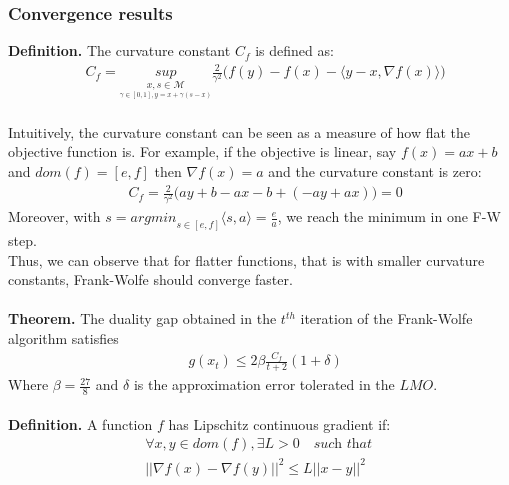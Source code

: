 \documentclass{article}
\begin{document}
\subsubsection{Convergence results}
\textbf{Definition.} The curvature constant $C_{f}$ is defined as:
\begin{equation*}
\begin{aligned}
    &C_{f}= \underset{\underset{ \gamma\in[0,1], y=x+\gamma(s-x)}{x,s\in\mathcal{M}}}{sup}\frac{2}{\gamma^{2}}\Big(f(y)- f(x)- \langle y-x, \nabla f(x)\rangle\Big)
\end{aligned}
\end{equation*}
\\
Intuitively, the curvature constant can be seen as a measure of how flat the objective function is. For example, if the objective is linear, say $f(x)= ax+ b$ and $dom(f)=[e,f]$ then $\nabla f(x)= a$ and the curvature constant is zero:
\begin{equation*}
\begin{aligned}
    &C_{f}= \frac{2}{\gamma^{2}}\Big(ay+ b- ax- b +(-ay +ax)\Big)= 0
\end{aligned}
\end{equation*}
Moreover, with $s=\textit{argmin}_{s\in[e,f]}\langle s, a\rangle= \frac{e}{a}$, we reach the minimum in one F-W step.\\
Thus, we can observe that for flatter functions, that is with smaller curvature constants, Frank-Wolfe should converge faster.
\\
\\
\textbf{Theorem.} The duality gap obtained in the $t^{th}$ iteration of the Frank-Wolfe algorithm satisfies
\begin{equation*}
\begin{aligned}
    &g(x_{t})\leq 2\beta\frac{C_{f}}{t+2}(1+\delta)
\end{aligned}
\end{equation*}
Where $\beta= \frac{27}{8}$ and $\delta$ is the approximation error tolerated in the $LMO$.
\\
\\
\textbf{Definition.} A function $f$ has Lipschitz continuous gradient if: 
\begin{equation*}
\begin{aligned}
    &\forall x,y \in dom(f), \exists L >0 \quad\textit{such that}\quad\\
    &||\nabla f(x) -\nabla f(y)||^2 \leq L||x - y||^2
\end{aligned}
\end{equation*}
\end{document}
